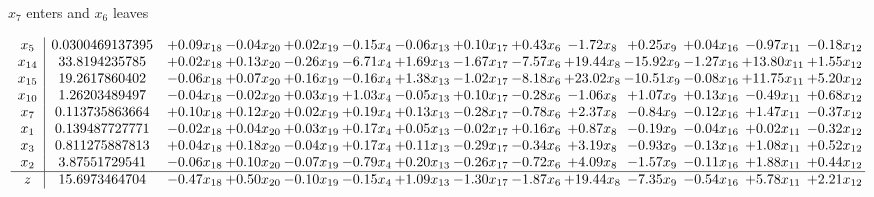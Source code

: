 \documentclass[8pt]{article}
\begin{document}
 $ x_{7} $ enters and $ x_{6} $ leaves 

 \[\begin{array}{c| c c@{\hskip 2pt} c@{\hskip 2pt} c@{\hskip 2pt} c@{\hskip 2pt} c@{\hskip 2pt} c@{\hskip 2pt} c@{\hskip 2pt} c@{\hskip 2pt} c@{\hskip 2pt} c@{\hskip 2pt} c@{\hskip 2pt} c@{\hskip 2pt} }
 x_{5}   &  0.0300469137395 & +  0.09 x_{18} & -0.04 x_{20} & +  0.02 x_{19} & -0.15 x_{4} & -0.06 x_{13} & +  0.10 x_{17} & +  0.43 x_{6} & -1.72 x_{8} & +  0.25 x_{9} & +  0.04 x_{16} & -0.97 x_{11} & -0.18 x_{12}\\
 x_{14}   &  33.8194235785 & +  0.02 x_{18} & +  0.13 x_{20} & -0.26 x_{19} & -6.71 x_{4} & +  1.69 x_{13} & -1.67 x_{17} & -7.57 x_{6} & + 19.44 x_{8} & -15.92 x_{9} & -1.27 x_{16} & + 13.80 x_{11} & +  1.55 x_{12}\\
 x_{15}   &  19.2617860402 & -0.06 x_{18} & +  0.07 x_{20} & +  0.16 x_{19} & -0.16 x_{4} & +  1.38 x_{13} & -1.02 x_{17} & -8.18 x_{6} & + 23.02 x_{8} & -10.51 x_{9} & -0.08 x_{16} & + 11.75 x_{11} & +  5.20 x_{12}\\
 x_{10}   &  1.26203489497 & -0.04 x_{18} & -0.02 x_{20} & +  0.03 x_{19} & +  1.03 x_{4} & -0.05 x_{13} & +  0.10 x_{17} & -0.28 x_{6} & -1.06 x_{8} & +  1.07 x_{9} & +  0.13 x_{16} & -0.49 x_{11} & +  0.68 x_{12}\\
 x_{7}   &  0.113735863664 & +  0.10 x_{18} & +  0.12 x_{20} & +  0.02 x_{19} & +  0.19 x_{4} & +  0.13 x_{13} & -0.28 x_{17} & -0.78 x_{6} & +  2.37 x_{8} & -0.84 x_{9} & -0.12 x_{16} & +  1.47 x_{11} & -0.37 x_{12}\\
 x_{1}   &  0.139487727771 & -0.02 x_{18} & +  0.04 x_{20} & +  0.03 x_{19} & +  0.17 x_{4} & +  0.05 x_{13} & -0.02 x_{17} & +  0.16 x_{6} & +  0.87 x_{8} & -0.19 x_{9} & -0.04 x_{16} & +  0.02 x_{11} & -0.32 x_{12}\\
 x_{3}   &  0.811275887813 & +  0.04 x_{18} & +  0.18 x_{20} & -0.04 x_{19} & +  0.17 x_{4} & +  0.11 x_{13} & -0.29 x_{17} & -0.34 x_{6} & +  3.19 x_{8} & -0.93 x_{9} & -0.13 x_{16} & +  1.08 x_{11} & +  0.52 x_{12}\\
 x_{2}   &  3.87551729541 & -0.06 x_{18} & +  0.10 x_{20} & -0.07 x_{19} & -0.79 x_{4} & +  0.20 x_{13} & -0.26 x_{17} & -0.72 x_{6} & +  4.09 x_{8} & -1.57 x_{9} & -0.11 x_{16} & +  1.88 x_{11} & +  0.44 x_{12}\\
\hline
z    &  15.6973464704 & -0.47 x_{18} & +  0.50 x_{20} & -0.10 x_{19} & -0.15 x_{4} & +  1.09 x_{13} & -1.30 x_{17} & -1.87 x_{6} & + 19.44 x_{8} & -7.35 x_{9} & -0.54 x_{16} & +  5.78 x_{11} & +  2.21 x_{12}\\
\end{array}\]
\end{document}
